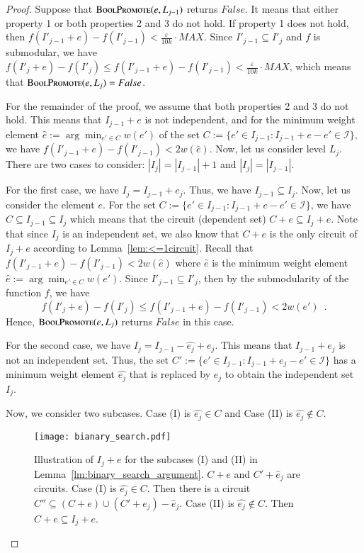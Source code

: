 \documentclass[11pt]{article}
\newcommand{\mI}{{\mathcal{I}}}
\newcommand{\eps}{\varepsilon}
\newcommand{\boolsuit}{\textsc{BoolPromote}}
\begin{document}
\begin{proof}
Suppose that $\boolsuit(e,L_{j-1})$ returns $False$. 
It means that either property 1 or both properties 2 and 3 do not hold.
If property 1 does not hold, then $f(I'_{j-1}+e)-f(I'_{j-1}) < \frac{\eps}{10k}\cdot MAX$. Since $I'_{j-1} \subseteq I'_j$ and $f$ is submodular, we have $f(I'_{j}+e)-f(I'_{j}) \leq f(I'_{j-1}+e)-f(I'_{j-1}) < \frac{\eps}{10k}\cdot MAX$, which means that $\boolsuit(e,L_j) = False$.

For the remainder of the proof, we assume that both properties 2 and 3 do not hold.
This means that $I_{j-1}+e$ is not independent, and for
the minimum weight element $\hat{e} := \arg\min_{e' \in C} w(e')$ of 
the set $C := \{ e' \in I_{j-1}: I_{j-1} + e - e' \in \mI\}$, we have  
$ {f(I'_{j-1} + e) - f(I'_{j-1})} < 2w(\hat{e})$. 
Now, let us consider level $L_{j}$. 
There are two cases to consider: $|I_{j}|=|I_{j-1}|+1$ and $|I_{j}| = |I_{j-1}|$.

For the first case, we have $I_{j} = I_{j-1} + {e_j}$.
Thus, we have $I_{j-1} \subseteq I_{j}$.
Now, let us consider the element $e$. 
For the set $C := \{ e' \in I_{j-1}: I_{j-1} + e - e' \in \mI\}$, 
we have $C \subseteq I_{j-1} \subseteq  I_{j}$ 
which means that the circuit (dependent set) $C + e \subseteq  I_{j} + {e}$. 
Note that since $I_j$ is an independent set, we also know that
$C+e$ is the only circuit of $I_j + {e}$ according to Lemma~\ref{lem:<=1circuit}. 
Recall that 
$ {f(I'_{j-1} + e) - f(I'_{j-1})} < 2w(\hat{e})$ where 
$\hat{e}$ is the minimum weight element $\hat{e} := \arg\min_{e' \in C} w(e')$.
Since $I'_{j-1} \subseteq I'_{j}$, then by the submodularity of the function $f$, 
we have 
$$
f(I'_{j} + e) - f(I'_{j}) \leq
f(I'_{j-1} + e) - f(I'_{j-1}) < 2w(e') \enspace .
$$
Hence, $\boolsuit(e,L_{j})$ returns $False$ in this case.







For the second case, we have $I_{j} = I_{j-1} - {\hat{e_j}} + e_j $. 
This means that $I_{j-1} + e_j$ is not an independent set. 
Thus, the set $C' := \{ e' \in I_{j-1}: I_{j-1} + e_j - e' \in \mI\}$ has 
a minimum weight element $\hat{e_j}$  
that is replaced by $e_j$ to obtain the independent set $I_{j}$. 

Now, we consider two subcases.
Case (I) is $\hat{e_j} \in C$ and Case (II) is $\hat{e_j} \notin C$. 


\begin{figure}[h]
\begin{center}
\texttt{[image: bianary\_search.pdf]}
\end{center}
\caption{Illustration of $I_j+e$ for the subcases (I) and (II) in Lemma~\ref{lm:binary_search_argument}.
$C+e$ and $C'+\hat{e}_j$ are circuits.
Case (I) is $\hat{e_j} \in C$. Then there is a circuit $C'' \subseteq (C+e)\cup (C'+e_j) -{\hat{e}_j}$.
Case (II) is $\hat{e_j} \notin C$. Then $C+e \subseteq I_j+e$.}
\label{fig:binaryS:lemma}
\end{figure}



\end{proof}
\end{document}
